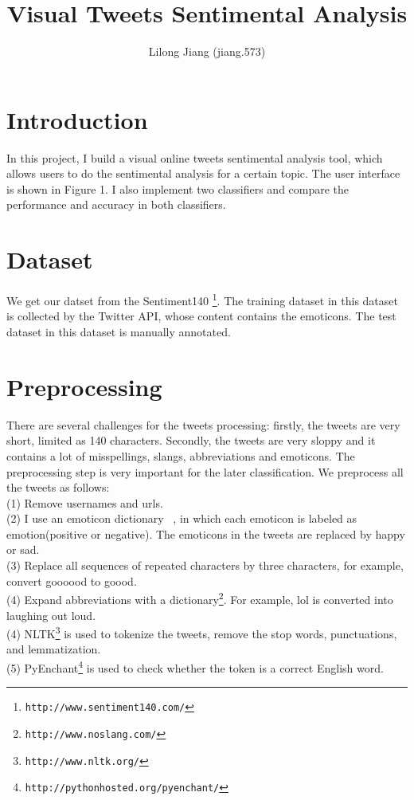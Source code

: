 \documentclass{article}
\begin{document}
\title{Visual Tweets Sentimental Analysis}
\author{Lilong Jiang (jiang.573)}
\maketitle

\section{Introduction}
In this project, I build a visual online tweets sentimental analysis tool, which allows users to do the sentimental analysis for a certain topic. The user interface is shown in Figure 1. I also implement two classifiers and compare the performance and accuracy in both classifiers. 
\section{Dataset}
We get our datset from the Sentiment140 \footnote{\texttt{\scriptsize{http://www.sentiment140.com/‎}}}. The training dataset in this dataset is collected by the Twitter API, whose content contains the emoticons. The test dataset in this dataset is manually annotated.
\section{Preprocessing}
There are several challenges for the tweets processing: firstly, the tweets are very short, limited as 140 characters. Secondly, the tweets are very sloppy and it contains a lot of misspellings, slangs, abbreviations and emoticons. The preprocessing step is very important for the later classification.
We preprocess all the tweets as follows: \\
(1) Remove usernames and urls. \\
(2) I use an emoticon dictionary ~\cite{agarwal2011sentiment}, in which each emoticon is labeled as emotion(positive or negative). The emoticons in the tweets are replaced by happy or sad. \\
(3) Replace all sequences of repeated characters by three characters, for example, convert goooood to goood.\\
(4) Expand abbreviations with a dictionary\footnote{\texttt{\scriptsize{http://www.noslang.com/‎‎}}}. For example, lol is converted into laughing out loud. \\
(4) NLTK\footnote{\texttt{\scriptsize{http://www.nltk.org/‎‎}}} is used to tokenize the tweets, remove the stop words, punctuations, and lemmatization. \\
(5) PyEnchant\footnote{\texttt{\scriptsize{http://pythonhosted.org/pyenchant/‎‎}}} is used to check whether the token is a correct English word. \\ 
\end{document}
